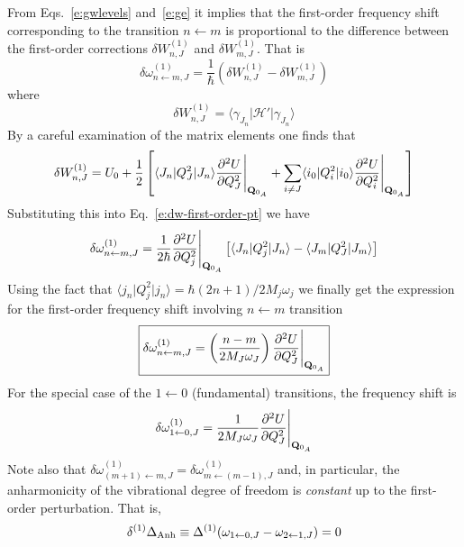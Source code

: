 \documentclass[b5paper,oneside,fleqn,11pt]{book}
\begin{document}
\begin{refsection}
From Eqs.~\eqref{e:gwlevels} and~\eqref{e:ge} it implies that 
the first\hyp{}order frequency shift corresponding to the transition
$n\leftarrow m$ 
is proportional to the difference between the first-order corrections 
$\delta W_{n,J}^{(1)}$ and $\delta W_{m,J}^{(1)}$. That is
%
\begin{equation}\label{e:dw-first-order-pt}
\delta \omega_{n\leftarrow m,J}^{(1)} = 
\frac{1}{\hbar} 
\left( \delta W_{n,J}^{(1)} - \delta W_{m,J}^{(1)} \right)
\end{equation}
%
where
%
%
\begin{equation}
\delta W_{n,J}^{(1)} = \langle \gamma_{J_n} \vert \mathscr{H}' \vert \gamma_{J_n} \rangle
\end{equation}
%
By a careful examination of the matrix elements one finds that
%
\begin{equation}
\delta W_{n,J}^{(1)} = U_0 + \frac{1}{2} 
\left[ 
                  \langle J_n \vert Q_J^2 \vert J_n \rangle \frac{\partial^2 U}{\partial Q_J^2} \Bigg|_{{\bf Q}_{0_A}}
  + \sum_{i\ne J} \langle i_0 \vert Q_i^2 \vert i_0 \rangle \frac{\partial^2 U}{\partial Q_i^2} \Bigg|_{{\bf Q}_{0_A}}
\right]
\end{equation}
%
Substituting this into Eq.~\eqref{e:dw-first-order-pt} we have
%
\begin{equation}
\delta \omega_{n\leftarrow m,J}^{(1)} = 
\frac{1}{2\hbar}  \frac{\partial^2 U}{\partial Q_j^2} \Bigg|_{{\bf Q}_{0_A}}
\left[
    \langle J_n \vert Q_j^2 \vert J_n \rangle - \langle J_m \vert Q_J^2 \vert J_m \rangle 
\right]
\end{equation}
%
Using the fact that $\langle j_n \vert Q_j^2 \vert j_n \rangle=\hbar(2n+1)/2M_j\omega_j$
we finally get the expression for the first\hyp{}order frequency shift involving $n\leftarrow m$
transition
%
\begin{equation}  \label{e:buckingham-1st-order}
\boxed{
\delta \omega_{n\leftarrow m,J}^{(1)} = \left( \frac{n-m}{2M_J\omega_J} \right) 
\frac{\partial^2 U}{\partial Q_J^2} \Bigg|_{{\bf Q}_{0_A}}
}
\end{equation}
%
For the special case of the $1\leftarrow 0$ (fundamental) transitions, the frequency
shift is
%
\begin{equation}  \label{e:buckingham-1st-order-fundamental}
\delta \omega_{1\leftarrow 0,J}^{(1)} =  \frac{1}{2M_J\omega_J}
\frac{\partial^2 U}{\partial Q_J^2} \Bigg|_{{\bf Q}_{0_A}}
\end{equation}
%
Note also that $\delta \omega_{(m+1)\leftarrow m,J}^{(1)} = \delta \omega_{m\leftarrow (m-1),J}^{(1)}$
and, in particular, the anharmonicity of the vibrational degree of freedom is \emph{constant}
up to the first\hyp{}order perturbation. That is,
%
\begin{equation}  \label{e:anharm-1st-order}
\delta^{(1)} \Delta_{\rm Anh} \equiv \Delta^{(1)} (\omega_{1\leftarrow 0,J} - \omega_{2\leftarrow 1,J}) = 0
\end{equation}
%


\end{refsection}
\end{document}
